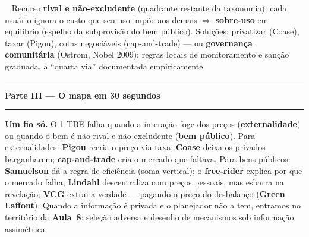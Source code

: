 \documentclass[11pt]{article}
\newcommand{\secao}[1]{%
  \bigskip
  {\color{insperred}\rule{\textwidth}{1.2pt}}\par
  \nopagebreak
  {\Large\bfseries\color{insperred} #1}\par
  \nopagebreak
  {\color{insperred}\rule{\textwidth}{0.4pt}}\par
  \smallskip}
\newcommand{\definicao}[1]{\par\medskip\noindent{\bfseries\color{insperdark}#1.}\ }
\begin{document}
\definicao{Tragédia dos comuns}
Recurso \textbf{rival e não-excludente} (quadrante restante da taxonomia): cada usuário ignora o custo
que seu uso impõe aos demais $\Rightarrow$ \textbf{sobre-uso} em equilíbrio (espelho da subprovisão do
bem público). Soluções: privatizar (Coase), taxar (Pigou), cotas negociáveis (cap-and-trade) --- ou
\textbf{governança comunitária} (Ostrom, Nobel 2009): regras locais de monitoramento e sanção graduada,
a ``quarta via'' documentada empiricamente.

\secao{Parte III --- O mapa em 30 segundos}

\begin{intuibox}
\textbf{Um fio só.} O 1\textordmasculine{} TBE falha quando a interação foge dos preços
(\textbf{externalidade}) ou quando o bem é não-rival e não-excludente (\textbf{bem público}).
Para externalidades: \textbf{Pigou} recria o preço via taxa; \textbf{Coase} deixa os privados barganharem;
\textbf{cap-and-trade} cria o mercado que faltava. Para bens públicos: \textbf{Samuelson} dá a regra de
eficiência (soma vertical); o \textbf{free-rider} explica por que o mercado falha; \textbf{Lindahl}
descentraliza com preços pessoais, mas esbarra na revelação; \textbf{VCG} extrai a verdade --- pagando o
preço do desbalanço (\textbf{Green--Laffont}). Quando a informação é privada e o planejador não a tem,
entramos no território da \textbf{Aula~8}: seleção adversa e desenho de mecanismos sob informação
assimétrica.
\end{intuibox}
\end{document}
